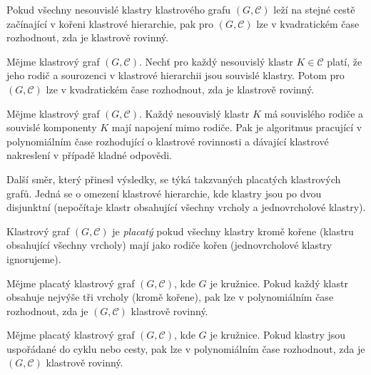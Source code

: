 \begin{theorem}
Pokud všechny nesouvislé klastry klastrového grafu $(G, \mathcal C)$ leží na stejné cestě začínající v kořeni klastrové hierarchie, pak pro $(G, \mathcal C)$ lze v kvadratickém čase rozhodnout, zda je klastrově rovinný.
\end{theorem}

\begin{theorem}
Mějme klastrový graf $(G, \mathcal C)$. Nechť pro každý nesouvislý klastr $K \in \mathcal C$ platí, že jeho rodič a sourozenci v klastrové hierarchii jsou souvislé klastry. Potom pro $(G, \mathcal C)$ lze v kvadratickém čase rozhodnout, zda je klastrově rovinný.
\end{theorem}

\begin{theorem}
Mějme klastrový graf $(G, \mathcal C)$. Každý nesouvislý klastr $K$ má souvislého rodiče a souvislé komponenty $K$ mají napojení mimo rodiče. Pak je algoritmus pracující v polynomiálním čase rozhodující o klastrové rovinnosti a dávající klastrové nakreslení v případě kladné odpovědi.
\end{theorem}

Další směr, který přinesl výsledky, se týká takzvaných placatých klastrových grafů. Jedná se o omezení klastrové hierarchie, kde klastry jsou po dvou disjunktní (nepočítaje klastr obsahující všechny vrcholy a jednovrcholové klastry).

\begin{defn}
Klastrový graf $(G, \mathcal C)$ je \textit{placatý} pokud všechny klastry kromě kořene (klastru obsahující všechny vrcholy) mají jako rodiče kořen (jednovrcholové klastry ignorujeme).
\end{defn}

\begin{theorem}
Mějme placatý klastrový graf  $(G, \mathcal C)$, kde $G$ je kružnice. Pokud každý klastr obsahuje nejvýše tři vrcholy (kromě kořene), pak lze v polynomiálním čase rozhodnout, zda je  $(G, \mathcal C)$ klastrově rovinný.
\end{theorem}

\begin{theorem}
Mějme placatý klastrový graf  $(G, \mathcal C)$, kde $G$ je kružnice. Pokud klastry jsou uspořádané do cyklu nebo cesty, pak lze v polynomiálním čase rozhodnout, zda je  $(G, \mathcal C)$ klastrově rovinný.
\end{theorem}

